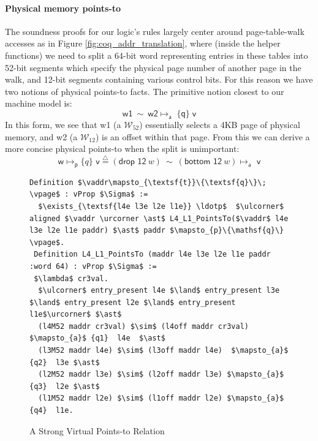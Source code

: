 \documentclass[acmsmall,screen,nonacm]{acmart}
\newcommand{\vaddr}{\kw{va}}
\newcommand{\vpage}{\textsf{v}}
\newcommand{\kw}[1]{\mathsf{#1}}
\begin{document}
\paragraph{Physical memory  points-to} The soundness proofs for our logic's rules largely center around page-table-walk accesses as in Figure \ref{fig:coq_addr_translation},
 where (inside the helper functions) we need to split a 64-bit word representing entries in these tables into 52-bit segments
which specify the physical page number of another page in the walk, and 12-bit segments containing various control bits.
For this reason we have two notions of physical points-to facts. The primitive notion closest to our machine model is:
\[ \textsf{w1} \ \sim \ \textsf{w2} \mapsto_{\textsf{a}} \; \{\textsf{q}\} \; \textsf{v} \]
In this form, we see that \textsf{w1} (a $\mathcal{W}_{52}$) essentially selects a 4KB page of physical memory,
and \textsf{w2} (a $\mathcal{W}_{12}$) is an offset within that page.
%
%
%
From this we can derive a more concise physical points-to when the split is unimportant:
%
\[\textsf{w} \mapsto_{\textsf{p}} \{q\} \textsf{ v} \stackrel{\triangle}{=} (\textsf{drop 12}~w) \ \sim \ (\textsf{bottom 12}~w)\mapsto_{\textsf{a}} \textsf{ v} \]

\begin{figure}
  \begin{lstlisting}[language=Coq]
 Definition $\vaddr\mapsto_{\textsf{t}}\{\textsf{q}\}\; \vpage$ : vProp $\Sigma$ := 
  $\exists_{\textsf{l4e l3e l2e l1e}} \ldotp$  $\ulcorner$ aligned $\vaddr \urcorner \ast$ L4_L1_PointsTo($\vaddr$ l4e l3e l2e l1e paddr) $\ast$ paddr $\mapsto_{p}\{\mathsf{q}\} \vpage$.
 Definition L4_L1_PointsTo (maddr l4e l3e l2e l1e paddr :word 64) : vProp $\Sigma$ :=
 $\lambda$ cr3val.
  $\ulcorner$ entry_present l4e $\land$ entry_present l3e $\land$ entry_present l2e $\land$ entry_present l1e$\urcorner$ $\ast$
  (l4M52 maddr cr3val) $\sim$ (l4off maddr cr3val) $\mapsto_{a}$ {q1}  l4e  $\ast$
  (l3M52 maddr l4e) $\sim$ (l3off maddr l4e)  $\mapsto_{a}$ {q2}  l3e $\ast$ 
  (l2M52 maddr l3e) $\sim$ (l2off maddr l3e) $\mapsto_{a}$ {q3}  l2e $\ast$
  (l1M52 maddr l2e) $\sim$ (l1off maddr l2e) $\mapsto_{a}$ {q4}  l1e.
\end{lstlisting}
\vspace{-1em}
\caption{A Strong Virtual Points-to Relation}
  \label{fig:strongvirtualpointsto}
\end{figure}
\end{document}
